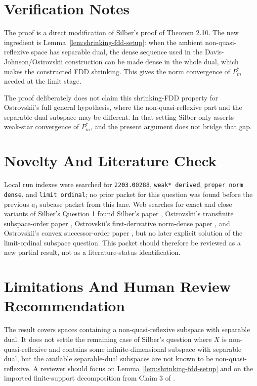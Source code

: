 \documentclass[11pt]{article}
\begin{document}
\section*{Verification Notes}

The proof is a direct modification of Silber's proof of Theorem 2.10.  The
new ingredient is Lemma~\ref{lem:shrinking-fdd-setup}: when the ambient
non-quasi-reflexive space has separable dual, the dense sequence used in the
Davis-Johnson/Ostrovskii construction can be made dense in the whole dual,
which makes the constructed FDD shrinking.  This gives the norm convergence of
\(P_m^*\) needed at the limit stage.

The proof deliberately does not claim this shrinking-FDD property for
Ostrovskii's full general hypothesis, where the non-quasi-reflexive part and
the separable-dual subspace may be different.  In that setting Silber only
asserts weak-star convergence of \(P_m^*\), and the present argument does not
bridge that gap.

\section*{Novelty And Literature Check}

Local run indexes were searched for \texttt{2203.00288}, \texttt{weak* derived},
\texttt{proper norm dense}, and \texttt{limit ordinal}; no prior packet for this
question was found before the previous \(c_0\) subcase packet from this lane.
Web searches for exact and close variants of Silber's Question 1 found
Silber's paper \cite{Silber2022}, Ostrovskii's transfinite subspace-order paper
\cite{Ostrovskii1993}, Ostrovskii's first-derivative norm-dense paper
\cite{Ostrovskii2011}, and Ostrovskii's convex successor-order paper
\cite{Ostrovskii2021}, but no later explicit solution of the limit-ordinal
subspace question.  This packet should therefore be reviewed as a new partial
result, not as a literature-status identification.

\section*{Limitations And Human Review Recommendation}

The result covers spaces containing a non-quasi-reflexive subspace with
separable dual.  It does not settle the remaining case of Silber's question
where \(X\) is non-quasi-reflexive and contains some infinite-dimensional
subspace with separable dual, but the available separable-dual subspaces are
not known to be non-quasi-reflexive.  A reviewer should focus on
Lemma~\ref{lem:shrinking-fdd-setup} and on the imported finite-support
decomposition from Claim 3 of \cite[Theorem 2.10]{Silber2022}.
\end{document}
